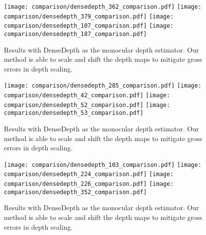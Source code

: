\begin{figure}[H]
  \texttt{[image: comparison/densedepth\_362\_comparison.pdf]}
  \texttt{[image: comparison/densedepth\_379\_comparison.pdf]}
  \texttt{[image: comparison/densedepth\_107\_comparison.pdf]}
  \texttt{[image: comparison/densedepth\_187\_comparison.pdf]}
  \caption{Results with DenseDepth as the monocular depth estimator. Our method is able to scale and
    shift the depth maps to mitigate gross errors in depth scaling.}
  \label{fig:densedepth_1}
\end{figure}
\begin{figure}[H]
  \texttt{[image: comparison/densedepth\_285\_comparison.pdf]}
  \texttt{[image: comparison/densedepth\_42\_comparison.pdf]}
  \texttt{[image: comparison/densedepth\_52\_comparison.pdf]}
  \texttt{[image: comparison/densedepth\_53\_comparison.pdf]}
  \caption{Results with DenseDepth as the monocular depth estimator. Our method is able to scale and
    shift the depth maps to mitigate gross errors in depth scaling.}
  \label{fig:densedepth_2}
\end{figure}
\begin{figure}[H]
  \texttt{[image: comparison/densedepth\_103\_comparison.pdf]}
  \texttt{[image: comparison/densedepth\_224\_comparison.pdf]}
  \texttt{[image: comparison/densedepth\_226\_comparison.pdf]}
  \texttt{[image: comparison/densedepth\_352\_comparison.pdf]}
  \caption{Results with DenseDepth as the monocular depth estimator. Our method is able to scale and
    shift the depth maps to mitigate gross errors in depth scaling.}
  \label{fig:densedepth_3}
\end{figure}
